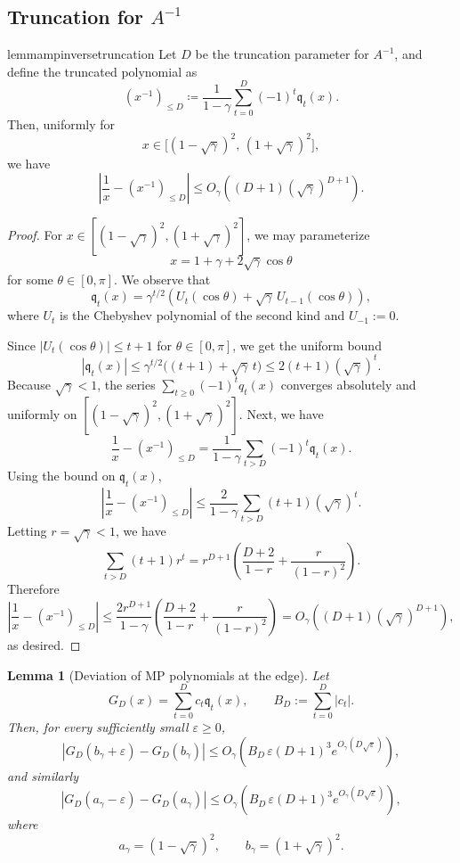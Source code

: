 \documentclass[12pt]{article}
\newtheorem{lemma}[theorem]{Lemma}
\newcommand{\gam}{\gamma}
\newcommand{\q}{\mathfrak q}
\begin{document}
\subsection{Truncation for \texorpdfstring{$A^{-1}$}{1/A}}
\begin{restatable}{lemma}{mpinversetruncation} \label{lem:mp-inverse-truncation} Let \(D\) be the truncation parameter for \(A^{-1}\), and define the truncated polynomial as \[ (x^{-1})_{\le D} \coloneqq \frac{1}{1-\gamma} \sum_{t=0}^{D}(-1)^t \q_t(x). \] Then, uniformly for \[ x\in\bigl[(1-\sqrt{\gamma})^2,\,(1+\sqrt{\gamma})^2\bigr], \] we have \[ \left| \frac{1}{x}-(x^{-1})_{\le D} \right| \le O_\gamma\!\left((D+1)(\sqrt{\gamma})^{D+1}\right). \] \end{restatable}\begin{proof}
	
For \(x\in [(1-\sqrt{\gamma})^2, (1+\sqrt{\gam} )^2 ]\), we may parameterize \[ x=1+\gamma+2\sqrt{\gamma}\cos\theta \] for some \(\theta\in[0,\pi]\). We observe that \[ \q_t(x) = \gamma^{t/2} \left( U_t(\cos\theta)+\sqrt{\gamma}\,U_{t-1}(\cos\theta) \right), \] where \(U_t\) is the Chebyshev polynomial of the second kind and \(U_{-1}:=0\). 

Since \( |U_t(\cos\theta)|\le t+1 \) for \(\theta\in[0,\pi]\), we get the uniform bound \[ |\q_t(x)| \le \gamma^{t/2}\bigl((t+1)+\sqrt{\gamma}\,t\bigr) \le 2(t+1)(\sqrt{\gamma})^t. \] Because \(\sqrt{\gamma}<1\), the series \( \sum_{t\ge0}(-1)^t q_t(x) \) converges absolutely and uniformly on \([(1-\sqrt{\gamma})^2, (1+\sqrt{\gam} )^2 ]\). 
Next, we have \[ \frac1x-(x^{-1})_{\le D} = \frac{1}{1-\gamma} \sum_{t>D}(-1)^t \q_t(x). \] Using the bound on \(\q_t(x)\), \[ \left| \frac1x-(x^{-1})_{\le D} \right| \le \frac{2}{1-\gamma} \sum_{t>D}(t+1)(\sqrt{\gamma})^t. \] Letting \(r=\sqrt{\gamma}<1\), we have \[ \sum_{t>D}(t+1)r^t = r^{D+1} \left( \frac{D+2}{1-r} + \frac{r}{(1-r)^2} \right). \] Therefore \[ \left| \frac1x-(x^{-1})_{\le D} \right| \le \frac{2r^{D+1}}{1-\gamma} \left( \frac{D+2}{1-r} + \frac{r}{(1-r)^2} \right) = O_\gamma\!\left((D+1)(\sqrt{\gamma})^{D+1}\right), \] as desired. \end{proof}

\begin{lemma}[Deviation of MP polynomials at the edge]
\label{lem:mp-edge-deviation-detailed}
Let
\[
    G_D(x)=\sum_{t=0}^D c_t\q_t(x),
    \qquad
    B_D:=\sum_{t=0}^D |c_t|.
\]
Then, for every sufficiently small \(\varepsilon\ge0\),
\[
    |G_D(b_\gam+\varepsilon)-G_D(b_\gam)|
    \le
    O_\gam\!\left(
        B_D\,\varepsilon (D+1)^3 e^{O_\gam(D\sqrt{\varepsilon})}
    \right),
\]
and similarly
\[
    |G_D(a_\gam-\varepsilon)-G_D(a_\gam)|
    \le
    O_\gam\!\left(
        B_D\,\varepsilon (D+1)^3 e^{O_\gam(D\sqrt{\varepsilon})}
    \right),
\]
where
\[
    a_\gam=(1-\sqrt{\gam})^2,\qquad
    b_\gam=(1+\sqrt{\gam})^2.
\]
\end{lemma}
\end{document}
